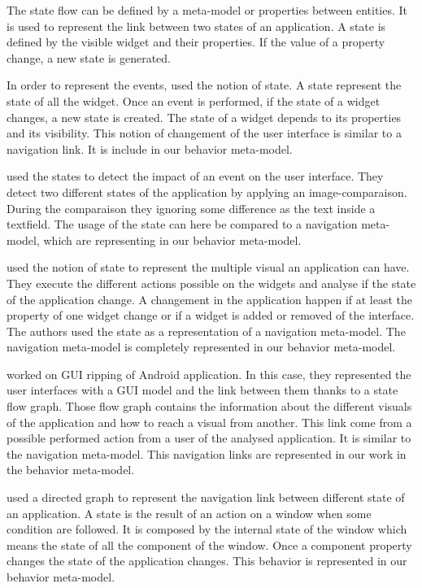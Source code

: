 \documentclass[conference]{IEEEtran}
\begin{document}
The state flow can be defined by a meta-model or properties between entities.
It is used to represent the link between two states of an application.
A state is defined by the visible widget and their properties.
If the value of a property change, a new state is generated.

In order to represent the events, 
    \citet{memon2007eventflow} used the notion of state.
A state represent the state of all the widget.
Once an event is performed,
    if the state of a widget changes, a new state is created.
The state of a widget depends to its properties and its visibility.
This notion of changement of the user interface is similar to a navigation link.
It is include in our behavior meta-model.

\citet{joorabchi2012reverse} used the states to detect the impact
    of an event on the user interface.
They detect two different states of the application by applying an image-comparaison.
During the comparaison they ignoring some difference as the text inside a textfield.
The usage of the state can here be compared to a navigation meta-model,
    which are representing in our behavior meta-model.

\citet{mesbah2012crawling} used the notion of state to represent the multiple
    visual an application can have.
They execute the different actions possible on the widgets and analyse if the state of the application change.
A changement in the application happen if at least the property of one widget change or if a widget is added or removed of the interface.
The authors used the state as a representation of a navigation meta-model.
The navigation meta-model is completely represented in our behavior meta-model.

\citet{amalfitano2012using} worked on GUI ripping of Android application.
In this case, they represented the user interfaces with a GUI model and the link
    between them thanks to a state flow graph.
Those flow graph contains the information about the different visuals of the application and how to reach
    a visual from another.
This link come from a possible performed action from a user of the analysed application.
It is similar to the navigation meta-model.
This navigation links are represented in our work in the behavior meta-model.

\citet{silva2010guisurfer} used a directed graph to represent the navigation link between different state of an application.
A state is the result of an action on a window when some condition are followed.
It is composed by the internal state of the window which means the state of all the component of the window.
Once a component property changes the state of the application changes.
This behavior is represented in our behavior meta-model.
\end{document}
